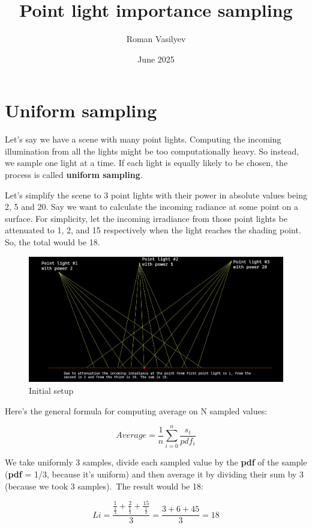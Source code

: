 \documentclass{article}
\title{Point light importance sampling}
\author{Roman Vasilyev}
\date{June 2025}
\begin{document}
\maketitle

\section{Uniform sampling}
Let's say we have a scene with many point lights. Computing the incoming illumination from all the lights might be too computationally heavy.
So instead, we sample one light at a time. If each light is equally likely to be chosen, the process is called \textbf{uniform sampling}.

Let's simplify the scene to 3 point lights with their power in absolute values being 2, 5 and 20.
Say we want to calculate the incoming radiance at some point on a surface.
For simplicity, let the incoming irradiance from those point lights be attenuated to 1, 2, and 15 respectively when the light reaches the shading point. So, the total would be 18.

\begin{figure}[h]
    \centering
    \includegraphics[width=\textwidth]{a.png}
    \caption{Initial setup}
    \label{fig:enter-label}
\end{figure}

Here's the general formula for computing average on N sampled values:

\[Average = \frac{1}{n} \displaystyle\sum_{i=0}^{n} \frac{s_i}{pdf_i}\]

We take uniformly 3 samples, divide each sampled value by the \textbf{pdf} of the sample (\textbf{pdf} = 1/3, because it's uniform) and then
average it by dividing their sum by 3 (because we took 3 samples).\
The result would be 18:

\[Li = \frac{\frac{1}{\frac{1}{3}} + \frac{2}{\frac{1}{3}} + \frac{15}{\frac{1}{3}}}{3} = \frac{3 + 6 + 45}{3} = 18\]
\end{document}
